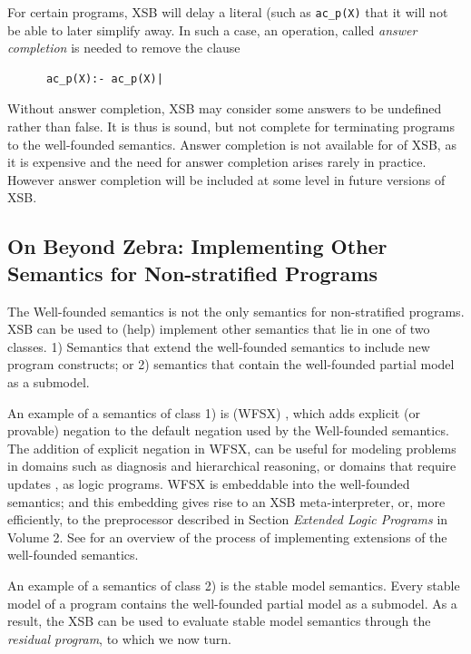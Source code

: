 For certain programs, XSB will delay a literal (such as {\tt ac\_p(X)}
that it will not be able to later simplify away.  In such a case, an
operation, called {\em answer completion} is needed to remove the
clause
\begin{verbatim}
      ac_p(X):- ac_p(X)|
\end{verbatim}
Without answer completion, XSB may consider some answers to be
undefined rather than false.  It is thus is sound, but not complete
for terminating programs to the well-founded semantics.  Answer
completion is not available for \version{} of XSB, as it is expensive
and the need for answer completion arises rarely in practice.  However
answer completion will be included at some level in future versions of
XSB\@.

\subsection{On Beyond Zebra: Implementing Other Semantics for
Non-stratified Programs} \label{sec:non-strat}

The Well-founded semantics is not the only semantics for
non-stratified programs.  XSB can be used to (help) implement other
semantics that lie in one of two classes.  1) Semantics that extend
the well-founded semantics to include new program constructs; or 2)
semantics that contain the well-founded partial model as a submodel.

An example of a semantics of class 1) is (WFSX) \cite{ADP95}, which
adds explicit (or provable) negation to the default negation used by
the Well-founded semantics.  The addition of explicit negation in
WFSX, can be useful for modeling problems in domains such as diagnosis
and hierarchical reasoning, or domains that require updates
\cite{LePe98}, as logic programs.  WFSX is embeddable into the
well-founded semantics; and this embedding gives rise to an XSB
meta-interpreter, or, more efficiently, to the preprocessor described
in Section {\it Extended Logic Programs} in Volume 2.  See
\cite{Swif99a} for an overview of the process of implementing
extensions of the well-founded semantics.

An example of a semantics of class 2) is the stable model semantics.
Every stable model of a program contains the well-founded partial
model as a submodel.  As a result, the XSB can be used to evaluate
stable model semantics through the {\em residual program}, to which we
now turn.


